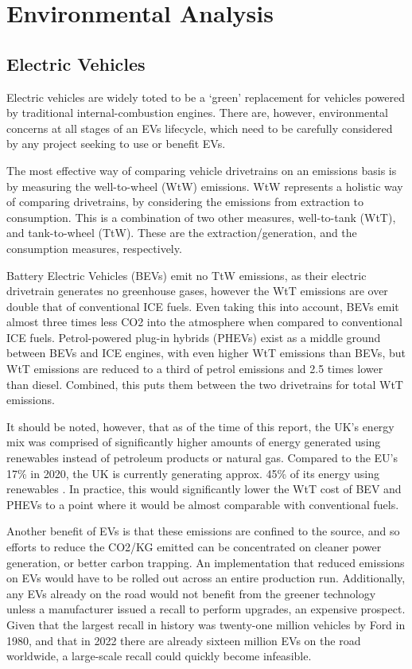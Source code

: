 \documentclass [12pt]{article}
\begin{document}
\section{Environmental Analysis}
\subsection{Electric Vehicles}
Electric vehicles are widely toted to be a ‘green’ replacement for vehicles powered by traditional internal-combustion engines. There are, however, environmental concerns at all stages of an EVs lifecycle, which need to be carefully considered by any project seeking to use or benefit EVs.

The most effective way of comparing vehicle drivetrains on an emissions basis is by measuring the well-to-wheel (WtW) emissions\cite{Well_To_Wheel}. WtW represents a holistic way of comparing drivetrains, by considering the emissions from extraction to consumption. This is a combination of two other measures, well-to-tank (WtT), and tank-to-wheel (TtW). These are the extraction/generation, and the consumption measures, respectively.

 Battery Electric Vehicles (BEVs) emit no TtW emissions, as their electric drivetrain generates no greenhouse gases, however the WtT emissions are over double that of conventional ICE fuels. Even taking this into account, BEVs emit almost three times less CO2 into the atmosphere when compared to conventional ICE fuels. Petrol-powered plug-in hybrids (PHEVs) exist as a middle ground between BEVs and ICE engines, with even higher WtT emissions than BEVs, but WtT emissions are reduced to a third of petrol emissions and 2.5 times lower than diesel. Combined, this puts them between the two drivetrains for total WtT emissions.

It should be noted, however, that as of the time of this report, the UK’s energy mix was comprised of significantly higher amounts of energy generated using renewables instead of petroleum products or natural gas. Compared to the EU’s 17\% in 2020\cite{Energy}, the UK is currently generating approx. 45\% of its energy using renewables \cite{Electricity_Generation}. In practice, this would significantly lower the WtT cost of BEV and PHEVs to a point where it would be almost comparable with conventional fuels.

Another benefit of EVs is that these emissions are confined to the source, and so efforts to reduce the CO2/KG emitted can be concentrated on cleaner power generation, or better carbon trapping. An implementation that reduced emissions on EVs would have to be rolled out across an entire production run. Additionally, any EVs already on the road would not benefit from the greener technology unless a manufacturer issued a recall to perform upgrades, an expensive prospect. Given that the largest recall in history was twenty-one million vehicles by Ford in 1980\cite{Ford_Transmission}, and that in 2022 there are already sixteen million EVs\cite{EV_on_Road} on the road worldwide, a large-scale recall could quickly become infeasible.
\end{document}
